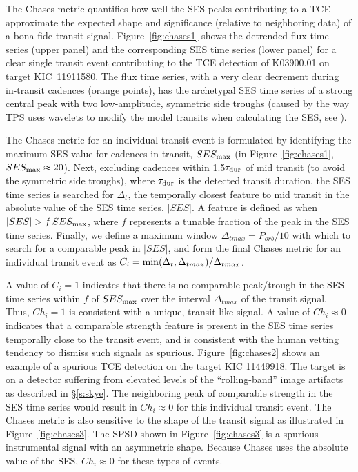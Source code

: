 The Chases metric quantifies how well the SES peaks contributing to a TCE approximate the expected shape and significance (relative to neighboring data) of a bona fide transit signal.  Figure~\ref{fig:chases1} shows the detrended flux time series (upper panel) and the corresponding SES time series (lower panel) for a clear single transit event contributing to the TCE detection of K03900.01 on target KIC~11911580.  The flux time series, with a very clear decrement during in-transit cadences (orange points), has the archetypal SES time series of a strong central peak with two low-amplitude, symmetric side troughs (caused by the way TPS uses wavelets to modify the model transits when calculating the SES, see \citealt{JenkinsKDPH}). 

The Chases metric for an individual transit event is formulated by identifying the maximum SES value for cadences in transit, $SES_{\rm max}$ (in Figure~\ref{fig:chases1}, $SES_{\rm max}\approx20$).  Next, excluding cadences within 1.5$\tau_{\rm dur}$ of mid transit (to avoid the symmetric side troughs), where $\tau_{\rm dur}$ is the detected transit duration, the SES time series is searched for $\Delta_{t}$, the temporally closest feature to mid transit in the absolute value of the SES time series, $\lvert SES \rvert$. A feature is defined as when  $\lvert SES \rvert>f\, SES_{\rm max}$, where $f$ represents a tunable fraction of the peak in the SES time series.  Finally, we define a maximum window $\Delta_{tmax}=P_{orb}/10$ with which to search for a comparable peak in $\lvert SES \rvert$, and form the final Chases metric for an individual transit event as $C_{i} = {\rm min}(\Delta_{t},\Delta_{tmax})/\Delta_{tmax}$.  

A value of $C_{i}=1$ indicates that there is no comparable peak/trough in the SES time series within $f$ of $SES_{\rm max}$ over the interval $\Delta_{tmax}$ of the transit signal.  Thus, $Ch_{i}=1$ is consistent with a unique, transit-like signal.  A value of $Ch_{i}\approx0$ indicates that a comparable strength feature is present in the SES time series temporally close to the transit event, and is consistent with the human vetting tendency to dismiss such signals as spurious.  Figure~\ref{fig:chases2} shows an example of a spurious TCE detection on the target KIC 11449918.  The target is on a detector suffering from elevated levels of the ``rolling-band'' image artifacts as described in \S\ref{s:skye}.  The neighboring peak of comparable strength in the SES time series would result in $Ch_{i}\approx0$ for this individual transit event.  The Chases metric is also sensitive to the shape of the transit signal as illustrated in Figure~\ref{fig:chases3}. The SPSD shown in Figure~\ref{fig:chases3} is a spurious instrumental signal with an asymmetric shape. Because Chases uses the absolute value of the SES, $Ch_{i}\approx0$ for these types of events.

